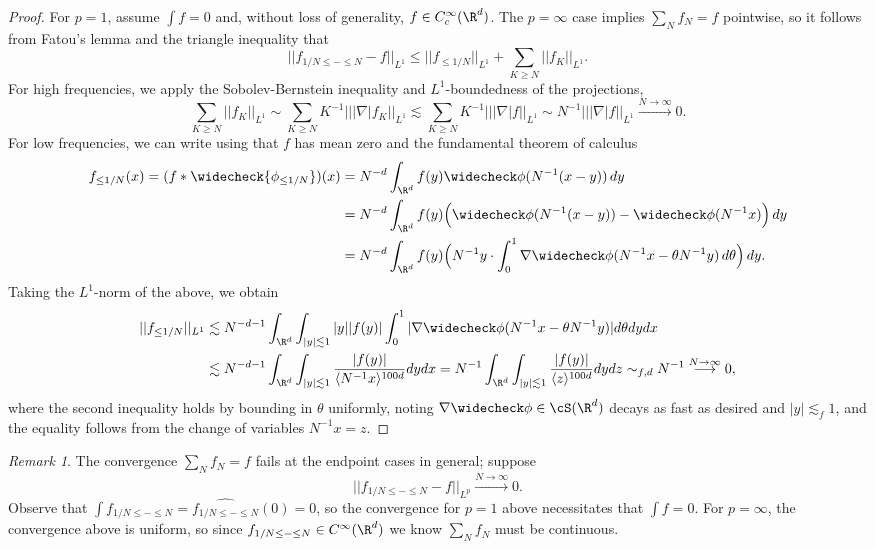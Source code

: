 \documentclass[reqno]{amsart}
\theoremstyle{definition}
\theoremstyle{remark}
\newtheorem*{remark}{Remark}
\begin{document}
\begin{proof}
				For $p = 1$, assume $\int f = 0$ and, without loss of generality, $f \in C^\infty_c (\R^d)$. The $p = \infty$ case implies $\sum_N f_N = f$ pointwise, so it follows from Fatou's lemma and the triangle inequality that 
					\[ ||  f_{1/N \leq - \leq N} - f||_{L^1} \leq || f_{\leq 1/N} ||_{L^1} + \sum_{K \geq N} ||f_K||_{L^1}.\]
				For high frequencies, we apply the Sobolev-Bernstein inequality and $L^1$-boundedness of the projections,  
					\[ \sum_{K \geq N} ||f_K||_{L^1} \sim \sum_{K \geq N} K^{-1} || |\nabla| f_K||_{L^1} \lesssim \sum_{K \geq N} K^{-1} || |\nabla| f||_{L^1} \sim N^{-1} || |\nabla| f||_{L^1} \overset{N \to \infty}{\longrightarrow} 0.\]
				For low frequencies, we can write using that $f$ has mean zero and the fundamental theorem of calculus
					\begin{align*}
						 f_{\leq 1/N} (x) 
							= (f * \widecheck{\phi_{\leq 1/N}})(x)
							&= N^{-d} \int_{\R^d} f(y)   \widecheck \phi(N^{-1} (x - y))  \, dy \\
							&= N^{-d} \int_{\R^d} f(y)  \Big( \widecheck \phi(N^{-1} (x - y)) - \widecheck \phi(N^{-1} x) \Big) \, dy\\
							&= N^{-d} \int_{\R^d} f(y)  \Big(N^{-1} y \cdot \int_0^1 \nabla \widecheck \phi(N^{-1} x - \theta N^{-1} y )\, d \theta \Big) \, dy.
					\end{align*}
				Taking the $L^1$-norm of the above, we obtain
					\begin{align*}
						||f_{\leq 1/N} ||_{L^1}
							&\lesssim N^{-d - 1} \int_{\R^d} \int_{|y|\lesssim 1} |y| |f(y)| \int_0^1 |\nabla \widecheck \phi (N^{-1} x - \theta N^{-1} y) | d \theta d y dx \\
							&\lesssim N^{-d - 1} \int_{\R^d} \int_{|y| \lesssim 1} \frac{|f(y)|}{\langle N^{-1}x \rangle^{100d}} dy dx = N^{-1} \int_{\R^d} \int_{|y| \lesssim 1} \frac{|f(y)|}{\langle z \rangle^{100 d}} dy dz \sim_{f, d} N^{-1} \overset{N \to \infty}{\longrightarrow} 0,
					\end{align*}	
			where the second inequality holds by bounding in $\theta$ uniformly, noting $\nabla \widecheck \phi \in \cS(\R^d)$ decays as fast as desired and $|y| \lesssim_f 1$, and the equality follows from the change of variables $N^{-1} x = z$. 
\end{proof}

\begin{remark}
	The convergence $\sum_N f_N = f$ fails at the endpoint cases in general; suppose 
		\[ ||f_{1/N \leq - \leq N} - f||_{L^p} \overset{N \to \infty}{\longrightarrow} 0. \]
	Observe that $\int f_{1/N \leq - \leq N} = \widehat{f_{1/N \leq - \leq N}} (0) = 0$, so the convergence for $p = 1$ above necessitates that $\int f = 0$. For $p = \infty$, the convergence above is uniform, so since $ f_{1/N \leq - \leq N} \in C^\infty (\R^d)$ we know $\sum_N f_N$ must be continuous. 
\end{remark}
\end{document}
